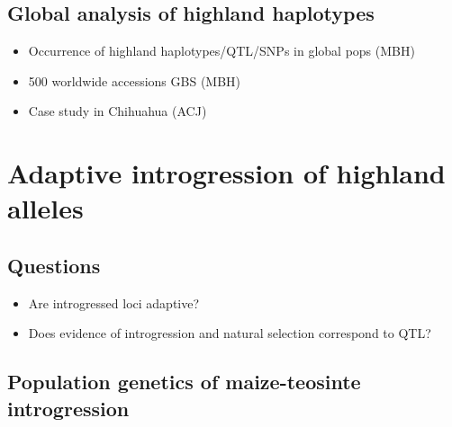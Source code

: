 
\subsection{Global analysis of highland haplotypes}
\begin{itemize}
\item Occurrence of highland haplotypes/QTL/SNPs in global pops (MBH)
\item 500 worldwide accessions GBS (MBH)
\item Case study in Chihuahua (ACJ)
\end{itemize}

\section{Adaptive introgression of highland alleles}

\subsection*{Questions}
\begin{itemize}
\item Are introgressed loci adaptive?
\item Does evidence of introgression and natural selection correspond to QTL?
\end{itemize}

\subsection{Population genetics of maize-teosinte introgression} \label{subsec: intropopgen}

